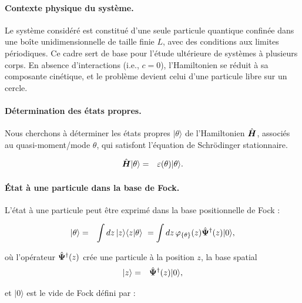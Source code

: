 \paragraph{Contexte physique du système.}

Le système considéré est constitué d’une seule particule quantique confinée dans une boîte unidimensionnelle de taille finie \(L\), avec des conditions aux limites périodiques. Ce cadre sert de base pour l’étude ultérieure de systèmes à plusieurs corps. En absence d’interactions (i.e., \(c = 0\)), l’Hamiltonien se réduit à sa composante cinétique, et le problème devient celui d’une particule libre sur un cercle.


\paragraph{Détermination des états propres.}

Nous cherchons à déterminer les états propres \(\vert \theta \rangle\) de l’Hamiltonien \(\hat{\bm{H}}\), associés au quasi-moment/mode \(\theta\), qui satisfont l’équation de Schrödinger stationnaire.


\begin{eqnarray}
	\hat{\bm{H}} \vert \theta \rangle & = & \varepsilon(\theta) \vert \theta \rangle.
\end{eqnarray}

\paragraph{État à une particule dans la base de Fock.}

L’état à une particule peut être exprimé dans la base positionnelle de Fock :

\begin{eqnarray}
	\vert \theta \rangle & = & \int dz\, \vert z \rangle \langle z \vert \theta \rangle ~= \int dz\, \varphi_{\{\theta\}}(z) \hat{\bm{\Psi}}^\dag(z) \vert 0 \rangle,
\end{eqnarray}

où l’opérateur \(\hat{\bm{\Psi}}^\dag(z)\) crée une particule à la position \(z\), la base spatial
\begin{eqnarray}
	\vert z \rangle  & = & \hat{\bm{\Psi}}^\dag (z)\vert 0 \rangle ,
\end{eqnarray}

et \(\vert 0 \rangle\) est le vide de Fock défini par :

